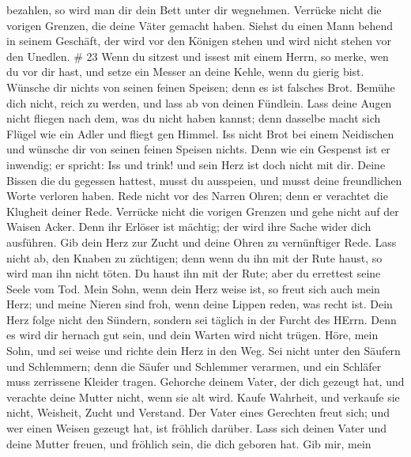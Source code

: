 bezahlen, so wird man dir dein Bett unter dir wegnehmen. 
Verrücke nicht die vorigen Grenzen, die deine Väter gemacht haben.
 Siehst du einen Mann behend in seinem Geschäft, der wird
vor den Königen stehen und wird nicht stehen vor den Unedlen. \# 23
 Wenn du sitzest und issest mit einem Herrn, so merke, wen
du vor dir hast,  und setze ein Messer an deine Kehle, wenn
du gierig bist.  Wünsche dir nichts von seinen feinen
Speisen; denn es ist falsches Brot.  Bemühe dich nicht,
reich zu werden, und lass ab von deinen Fündlein.  Lass
deine Augen nicht fliegen nach dem, was du nicht haben kannst; denn
dasselbe macht sich Flügel wie ein Adler und fliegt gen Himmel.
 Iss nicht Brot bei einem Neidischen und wünsche dir von
seinen feinen Speisen nichts.  Denn wie ein Gespenst ist er
inwendig; er spricht: Iss und trink! und sein Herz ist doch nicht mit
dir.  Deine Bissen die du gegessen hattest, musst du
ausspeien, und musst deine freundlichen Worte verloren haben.
 Rede nicht vor des Narren Ohren; denn er verachtet die
Klugheit deiner Rede.  Verrücke nicht die vorigen Grenzen
und gehe nicht auf der Waisen Acker.  Denn ihr Erlöser ist
mächtig; der wird ihre Sache wider dich ausführen.  Gib
dein Herz zur Zucht und deine Ohren zu vernünftiger Rede. 
Lass nicht ab, den Knaben zu züchtigen; denn wenn du ihn mit der Rute
haust, so wird man ihn nicht töten.  Du haust ihn mit der
Rute; aber du errettest seine Seele vom Tod.  Mein Sohn,
wenn dein Herz weise ist, so freut sich auch mein Herz; 
und meine Nieren sind froh, wenn deine Lippen reden, was recht ist.
 Dein Herz folge nicht den Sündern, sondern sei täglich in
der Furcht des HErrn.  Denn es wird dir hernach gut sein,
und dein Warten wird nicht trügen.  Höre, mein Sohn, und
sei weise und richte dein Herz in den Weg.  Sei nicht unter
den Säufern und Schlemmern;  denn die Säufer und Schlemmer
verarmen, und ein Schläfer muss zerrissene Kleider tragen. 
Gehorche deinem Vater, der dich gezeugt hat, und verachte deine Mutter
nicht, wenn sie alt wird.  Kaufe Wahrheit, und verkaufe sie
nicht, Weisheit, Zucht und Verstand.  Der Vater eines
Gerechten freut sich; und wer einen Weisen gezeugt hat, ist fröhlich
darüber.  Lass sich deinen Vater und deine Mutter freuen,
und fröhlich sein, die dich geboren hat.  Gib mir, mein

